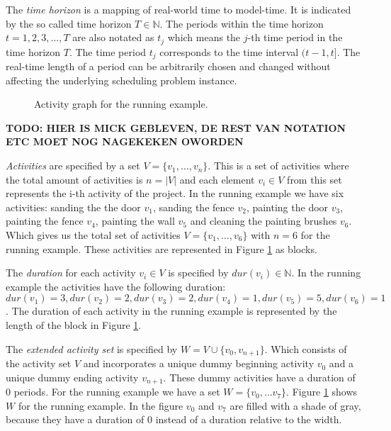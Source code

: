 \documentclass{article}
\theoremstyle{definition}
\newcommand{\inputtikz}[1]{}
\newcommand{\TODO}[1]{{\color{red}\textbf{TODO: #1}}}
\newcommand{\dur}[1]{\ensuremath{dur(v_{#1})}} %
\begin{document}
The \emph{time horizon} is a mapping of real-world time to model-time. It is indicated by the so called time horizon $T \in \mathbb{N}$.
The periods within the time horizon $t=1,2,3,\ldots,T$ are also notated as $t_j$ which means the $j$-th time period in the time horizon $T$. 
The time period $t_j$ corresponds to the time interval $(t-1,t]$. 
The real-time length of a period can be arbitrarily chosen and changed without affecting the underlying scheduling problem instance. 

\begin{figure}[ht]
	\centering
	\inputtikz{activity_graph}
	\caption{Activity graph for the running example.}
	\label{fig:activity_graph}
\end{figure}

\TODO{HIER IS MICK GEBLEVEN, DE REST VAN NOTATION ETC MOET NOG NAGEKEKEN OWORDEN}

\emph{Activities} are specified by a set $V = \{v_1, \ldots, v_n\}$.
This is a set of activities where the total amount of activities is $n = |V|$ and each element $v_i \in V$ from this set represents the i-th activity of the project.
In the running example we have six activities: sanding the the door $v_1$, sanding the fence $v_2$,  painting the door $v_3$, painting the fence $v_4$, painting the wall $v_5$ and cleaning the painting brushes $v_6$. 
Which gives us the total set of activities $V = \{v_1, \ldots, v_6\}$ with $n = 6$ for the running example.
These activities are represented in Figure \ref{fig:activity_graph} as blocks.

The \emph{duration} for each activity $v_i \in V$ is specified by $\dur{i} \in \mathbb{N}$.
In the running example the activities have the following duration: $\dur{1} = 3, \dur{2} = 2, \dur{3} = 2, \dur{4} = 1, \dur{5} = 5, \dur{6} = 1$. 
The duration of each activity in the running example is represented by the length of the block in Figure \ref{fig:activity_graph}.

The \emph{extended activity set} is specified by $W = V \cup \{v_0, v_{n+1}\}$.
Which consists of the activity set $V$ and incorporates a unique dummy beginning activity $v_0$ and a unique dummy ending activity $v_{n+1}$. 
These dummy activities have a duration of $0$ periods.
For the running example we have a set $W = \{v_0, \ldots v_7\}$.
Figure \ref{fig:activity_graph} shows $W$ for the running example.
In the figure $v_0$ and $v_7$ are filled with a shade of gray, because they have a duration of $0$ instead of a duration relative to the width. 
\end{document}
